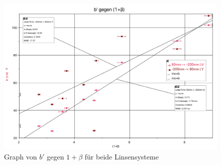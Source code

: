 \documentclass[11pt,a4paper]{article}
\begin{document}
\begin{figure}[h]
	\centering
	\includegraphics[width=\linewidth]{Abb5}
	\caption{Graph von $b'$ gegen $1+\beta$ für beide Linsensysteme}
\end{figure}
\end{document}
